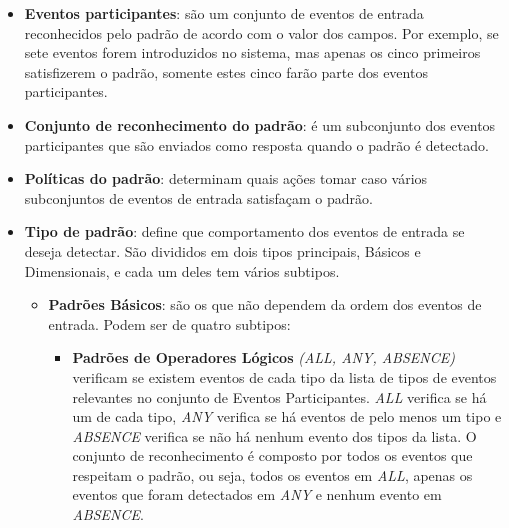 \begin{itemize}
\begin{itemize}
\item \textbf{Eventos participantes}: são um conjunto de eventos de entrada reconhecidos pelo padrão de acordo com o valor dos campos. Por exemplo, se sete eventos forem introduzidos no sistema, mas apenas os cinco primeiros satisfizerem o padrão, somente estes cinco farão parte dos eventos participantes. 
\item \textbf{Conjunto de reconhecimento do padrão}: é um subconjunto dos eventos participantes que são enviados como resposta quando o padrão é detectado. 
\item \textbf{Políticas do padrão}: determinam quais ações tomar caso vários subconjuntos de eventos de entrada satisfaçam o padrão. 
\item \textbf{Tipo de padrão}: define que comportamento dos eventos de entrada se deseja detectar. São divididos em dois tipos principais, Básicos e Dimensionais, e cada um deles tem vários subtipos. 
\begin{itemize}
\item \textbf{Padrões Básicos}: são os que não dependem da ordem dos eventos de entrada. Podem ser de quatro subtipos:
\begin{itemize}
\item \textbf{Padrões de Operadores Lógicos} \emph{(ALL, ANY, ABSENCE)} verificam se existem eventos de cada tipo da lista de tipos de eventos relevantes no conjunto de Eventos Participantes. \emph{ALL} verifica se há um de cada tipo, \emph{ANY} verifica se há eventos de pelo menos um tipo e \emph{ABSENCE} verifica se não há nenhum evento dos tipos da lista. O conjunto de reconhecimento é composto por todos os eventos que respeitam o padrão, ou seja, todos os eventos em \emph{ALL}, apenas os eventos que foram detectados em \emph{ANY} e nenhum evento em \emph{ABSENCE}.

\end{itemize}
\end{itemize}
\end{itemize}
\end{itemize}
